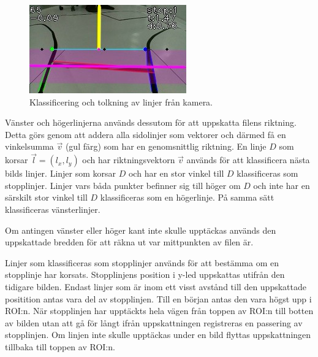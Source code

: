 \documentclass[tekniskrapport/tech.tex]{subfiles}
\begin{document}
\begin{figure}
    \begin{center}
        \includegraphics[width=\linewidth]{tekniskrapport/figures/opencv.jpg}
    \end{center}
    \caption{Klassificering och tolkning av linjer från kamera.}
\end{figure}

Vänster och högerlinjerna används dessutom för att uppskatta filens riktning.
Detta görs genom att addera alla sidolinjer som vektorer och därmed få en
vinkelsumma $\vec{v}$ (gul färg) som har en genomsnittlig riktning. En linje
$D$ som korsar $\vec{l}=(l_x, l_y)$ och har riktningsvektorn $\vec{v}$ används
för att klassificera nästa bilds linjer. Linjer som korsar $D$ och har en stor
vinkel till $D$ klassificeras som stopplinjer. Linjer vars båda punkter
befinner sig till höger om $D$ och inte har en särskilt stor vinkel till $D$
klassificeras som en högerlinje. På samma sätt klassificeras vänsterlinjer.

Om antingen vänster eller höger kant inte skulle upptäckas används den
uppskattade bredden för att räkna ut var mittpunkten av filen är.

Linjer som klassificeras som stopplinjer används för att bestämma om en
stopplinje har korsats. Stopplinjens position i y-led uppskattas utifrån den
tidigare bilden. Endast linjer som är inom ett visst avstånd till den
uppskattade positition antas vara del av stopplinjen. Till en början antas den
vara högst upp i ROI:n. När stopplinjen har upptäckts hela vägen från toppen av
ROI:n till botten av bilden utan att gå för långt ifrån uppskattningen
registreras en passering av stopplinjen. Om linjen inte skulle upptäckas under
en bild flyttas uppskattningen tillbaka till toppen av ROI:n.
  
\end{document}
